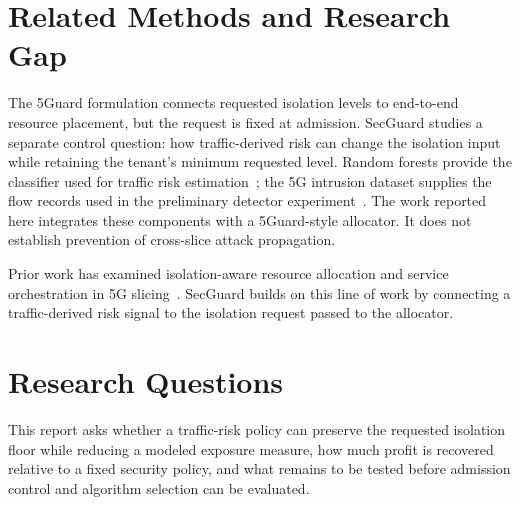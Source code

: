 \section{Related Methods and Research Gap}\label{sec:gap}
The 5Guard formulation connects requested isolation levels to end-to-end resource placement, but the request is fixed at admission. SecGuard studies a separate control question: how traffic-derived risk can change the isolation input while retaining the tenant's minimum requested level. Random forests provide the classifier used for traffic risk estimation~\cite{breiman2001random}; the 5G intrusion dataset supplies the flow records used in the preliminary detector experiment~\cite{open5gsdataset}. The work reported here integrates these components with a 5Guard-style allocator. It does not establish prevention of cross-slice attack propagation.

Prior work has examined isolation-aware resource allocation and service orchestration in 5G slicing~\cite{su2019isolation,taleb2019industrial}. SecGuard builds on this line of work by connecting a traffic-derived risk signal to the isolation request passed to the allocator.

\section{Research Questions}\label{sec:research-questions}
This report asks whether a traffic-risk policy can preserve the requested isolation floor while reducing a modeled exposure measure, how much profit is recovered relative to a fixed security policy, and what remains to be tested before admission control and algorithm selection can be evaluated.
